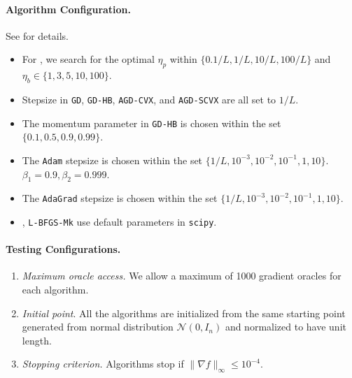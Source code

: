 \paragraph{Algorithm Configuration.} See  for details.
\begin{itemize}[leftmargin=10pt]
  \item For {\hdmbest}, we search for the optimal $\eta_p$ within $\{ 0.1 / L, 1 / L, 10 / L, 100/L \}$
  and $\eta_b \in \{ 1, 3, 5, 10, 100 \}$. 
  
  \item Stepsize in \texttt{GD}, \texttt{GD-HB},
  \texttt{AGD-CVX}, and \texttt{AGD-SCVX} are all set to $1 / L$.
  
  \item The momentum parameter in \texttt{GD-HB} is chosen within the set $\{
  0.1, 0.5, 0.9, 0.99 \}$.
  
  \item The \texttt{Adam} stepsize is chosen within the set $\{ 1 / L, 10^{- 3},
  10^{- 2}, 10^{- 1}, 1, 10 \}$. $\beta_1 = 0.9, \beta_2 = 0.999$.
  
  \item  The \texttt{AdaGrad} stepsize is chosen within the set $\{ 1 / L, 10^{- 3},
  10^{- 2}, 10^{- 1}, 1, 10 \}$.
  
  \item {\bfgs}, \texttt{L-BFGS-Mk} use default parameters in
  \texttt{scipy}.
\end{itemize}

\paragraph{Testing Configurations.}

\begin{enumerate}[leftmargin=15pt,label=\textbf{\arabic*)}]
  \item {\textit{Maximum oracle access.}} We allow a maximum of 1000 gradient
  oracles for each algorithm.
  
  \item {\textit{Initial point}}. All the algorithms are initialized from the
  same starting point generated from normal distribution $\mathcal{N} (0,
  I_n)$ and normalized to have unit length.
  
  \item {\textit{Stopping criterion.}} Algorithms stop if $\| \nabla f 
  \|_\infty \leq 10^{- 4}$.
\end{enumerate}

